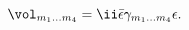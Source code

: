 \begin{equation}
   \vol_{m_1\dots m_4} = \ii \bar{\epsilon} \gamma_{m_1\dots m_4} \epsilon .
\end{equation}

